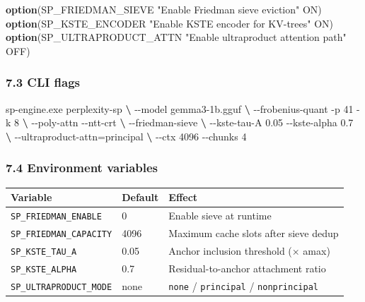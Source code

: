 \documentclass[
  11pt,
]{article}
\newenvironment{Shaded}{}{}
\newcommand{\ExtensionTok}[1]{#1}
\newcommand{\KeywordTok}[1]{\textcolor[rgb]{0.00,0.44,0.13}{\textbf{#1}}}
\newcommand{\NormalTok}[1]{#1}
\newcommand{\StringTok}[1]{\textcolor[rgb]{0.25,0.44,0.63}{#1}}
\begin{document}
\begin{Shaded}
\begin{Highlighting}[]
\KeywordTok{option}\NormalTok{(SP\_FRIEDMAN\_SIEVE       }\StringTok{"Enable Friedman sieve eviction"}\NormalTok{ ON)}
\KeywordTok{option}\NormalTok{(SP\_KSTE\_ENCODER         }\StringTok{"Enable KSTE encoder for KV{-}trees"}\NormalTok{ ON)}
\KeywordTok{option}\NormalTok{(SP\_ULTRAPRODUCT\_ATTN    }\StringTok{"Enable ultraproduct attention path"}\NormalTok{ OFF)}
\end{Highlighting}
\end{Shaded}

\hypertarget{cli-flags}{%
\subsubsection{7.3 CLI flags}\label{cli-flags}}

\begin{Shaded}
\begin{Highlighting}[]
\ExtensionTok{sp{-}engine.exe}\NormalTok{ perplexity{-}sp }\KeywordTok{\textbackslash{}}
    \ExtensionTok{{-}{-}model}\NormalTok{ gemma3{-}1b.gguf }\KeywordTok{\textbackslash{}}
    \ExtensionTok{{-}{-}frobenius{-}quant}\NormalTok{ {-}p 41 {-}k 8 }\KeywordTok{\textbackslash{}}
    \ExtensionTok{{-}{-}poly{-}attn}\NormalTok{ {-}{-}ntt{-}crt }\KeywordTok{\textbackslash{}}
    \ExtensionTok{{-}{-}friedman{-}sieve} \KeywordTok{\textbackslash{}}
    \ExtensionTok{{-}{-}kste{-}tau{-}A}\NormalTok{ 0.05 {-}{-}kste{-}alpha 0.7 }\KeywordTok{\textbackslash{}}
    \ExtensionTok{{-}{-}ultraproduct{-}attn}\NormalTok{=principal }\KeywordTok{\textbackslash{}}
    \ExtensionTok{{-}{-}ctx}\NormalTok{ 4096 {-}{-}chunks 4}
\end{Highlighting}
\end{Shaded}

\hypertarget{environment-variables}{%
\subsubsection{7.4 Environment variables}\label{environment-variables}}

\begin{longtable}[]{@{}lll@{}}
\toprule
Variable & Default & Effect\tabularnewline
\midrule
\endhead
\texttt{SP\_FRIEDMAN\_ENABLE} & 0 & Enable sieve at
runtime\tabularnewline
\texttt{SP\_FRIEDMAN\_CAPACITY} & 4096 & Maximum cache slots after sieve
dedup\tabularnewline
\texttt{SP\_KSTE\_TAU\_A} & 0.05 & Anchor inclusion threshold (×
amax)\tabularnewline
\texttt{SP\_KSTE\_ALPHA} & 0.7 & Residual-to-anchor attachment
ratio\tabularnewline
\texttt{SP\_ULTRAPRODUCT\_MODE} & none & \texttt{none} /
\texttt{principal} / \texttt{nonprincipal}\tabularnewline
\bottomrule
\end{longtable}
\end{document}
